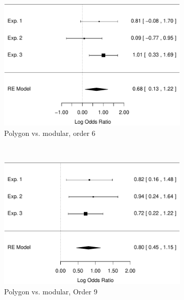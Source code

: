 \documentclass[man,10pt]{apa6}
\begin{document}
\begin{figure}
\centering
\begin{subfigure}[c]{0.4\textwidth}
\centering
\includegraphics[width=\textwidth]{figures/meta/question_typegenerator_true_6_conditionpolygon.pdf}
\caption{Polygon vs. modular, order 6}
\end{subfigure}
~
\begin{subfigure}[c]{0.4\textwidth}
\centering
\includegraphics[width=\textwidth]{figures/meta/question_typegenerator_true_9_conditionpolygon.pdf}
\caption{Polygon vs. modular, Order 9}
\end{subfigure} \\
\centering
\begin{subfigure}[c]{0.4\textwidth}
\centering

\end{subfigure}
\end{figure}
\end{document}

